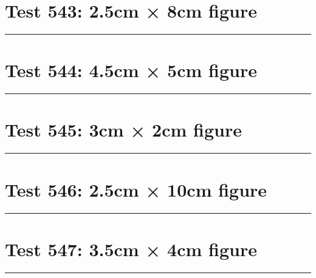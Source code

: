 \documentclass[a4paper,11pt]{article}
\begin{document}
\section*{Test 543: 2.5cm × 8cm figure}
\begin{swarmwrap}%
  \begin{minipage}[t]{2cm}
    \centering
    \rule{\linewidth}{8cm}
  \end{minipage}%
\end{swarmwrap}%
\swarmwrapnext
\lipsum[124]
\lipsum[125]
\lipsum[126]
\lipsum[127]
\lipsum[128]
\lipsum[129]
\section*{Test 544: 4.5cm × 5cm figure}
\begin{swarmwrap}%
  \begin{minipage}[t]{4cm}
    \centering
    \rule{\linewidth}{5cm}
  \end{minipage}%
\end{swarmwrap}%
\swarmwrapnext
\lipsum[84]
\lipsum[85]
\lipsum[86]
\lipsum[87]
\lipsum[88]
\section*{Test 545: 3cm × 2cm figure}
\begin{swarmwrap}%
  \begin{minipage}[t]{3cm}
    \centering
    \rule{\linewidth}{2cm}
  \end{minipage}%
\end{swarmwrap}%
\swarmwrapnext
\lipsum[148]
\lipsum[149]
\lipsum[150]
\section*{Test 546: 2.5cm × 10cm figure}
\begin{swarmwrap}%
  \begin{minipage}[t]{2cm}
    \centering
    \rule{\linewidth}{10cm}
  \end{minipage}%
\end{swarmwrap}%
\swarmwrapnext
\lipsum[46]
\lipsum[47]
\lipsum[48]
\section*{Test 547: 3.5cm × 4cm figure}
\begin{swarmwrap}%
  \begin{minipage}[t]{3cm}
    \centering
    \rule{\linewidth}{4cm}
  \end{minipage}%
\end{swarmwrap}%
\swarmwrapnext
\lipsum[103]
\lipsum[104]
\lipsum[105]
\end{document}
